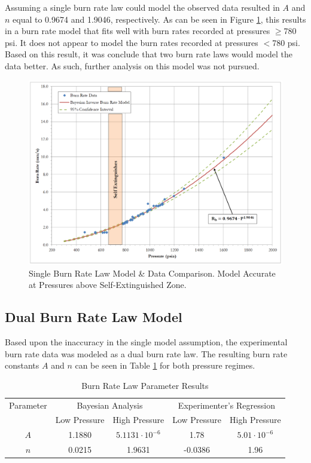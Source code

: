 \documentclass{article}
\begin{document}
Assuming a single burn rate law could model the observed data resulted in $A$ and $n$ equal 
to 0.9674 and 1.9046, respectively. As can be seen in Figure \ref{SingleBRfig}, this 
results in a burn rate model that fits well with burn rates recorded at pressures $\geq$780 psi.
It does not appear to model the burn rates recorded at pressures $<$780 psi. 
Based on this result, it was conclude that two burn rate laws would model the data better. 
As such, further analysis on this model was not pursued.

\begin{figure}[htb]
\centering
\includegraphics[width=\textwidth]{Single_Burn_Rate_Results.png}
\caption{Single Burn Rate Law Model \& Data Comparison. Model Accurate at Pressures above Self-Extinguished Zone.}
\label{SingleBRfig}
\end{figure}

\subsection{Dual Burn Rate Law Model} \label{twoBurnRateResults}

Based upon the inaccuracy in the single model assumption, the experimental burn rate data was modeled
as a dual burn rate law. The resulting burn rate constants $A$ and $n$ can be seen in Table
\ref{Table:brlpresults} for both pressure regimes. 

\begin{table}
\caption{Burn Rate Law Parameter Results}
\label{Table:brlpresults}
\begin{tabular}{|c|c|c|c|c|}
\hline
Parameter & \multicolumn{2}{|c|}{Bayesian Analysis} & \multicolumn{2}{|c|}{Experimenter's Regression} \\ \cline{2-5}
 & Low Pressure & High Pressure & Low Pressure & High Pressure \\ \hline
$A$ & 1.1880 & $5.1131 \cdot 10^{-6}$ & 1.78 & $5.01 \cdot 10^{-6}$ \\ \hline
$n$ & 0.0215 & 1.9631 & -0.0386 & 1.96 \\
\hline
\end{tabular}
\end{table}
\end{document}
